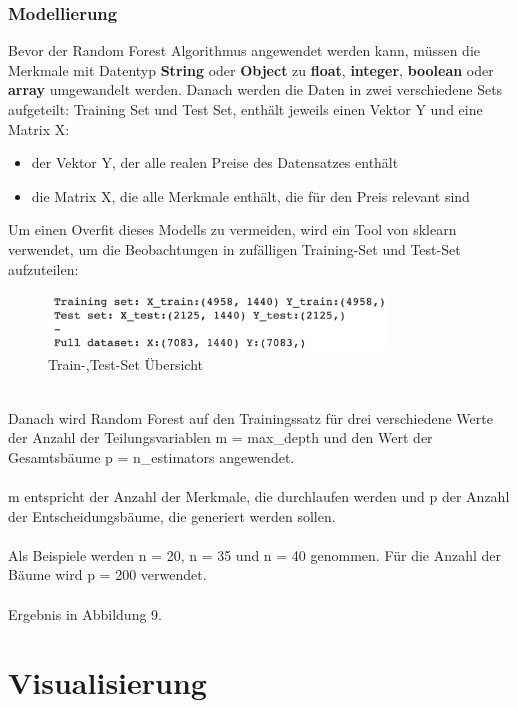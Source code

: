 \documentclass[12pt]{article}
\begin{document}
\begin{text}
\section{Modellierung}
Bevor der Random Forest Algorithmus angewendet werden kann, müssen die Merkmale mit Datentyp \textbf{String} oder \textbf{Object} zu \textbf{float}, \textbf{integer}, \textbf{boolean} oder \textbf{array} umgewandelt werden. Danach werden die Daten in zwei verschiedene Sets aufgeteilt: Training Set und Test Set, enthält jeweils einen Vektor Y und eine Matrix X: 
\begin{itemize}
    \item der Vektor Y, der alle realen Preise des Datensatzes enthält
    \item die Matrix X, die alle Merkmale enthält, die für den Preis relevant sind
\end{itemize}
\newpage
Um einen Overfit dieses Modells zu vermeiden, wird ein Tool von sklearn verwendet, um die Beobachtungen in zufälligen Training-Set und Test-Set aufzuteilen:
\\
\begin{figure}[ht]
\begin{center}
 \includegraphics[width=0.8\textwidth]{split_Set.png}
 \caption{Train-,Test-Set Übersicht}
\end{center}
\end{figure}
\\
Danach wird Random Forest auf den Trainingssatz für drei verschiedene Werte der Anzahl der Teilungsvariablen m = max\_depth und den Wert der Gesamtsbäume p = n\_estimators angewendet. 
\\\\
m entspricht der Anzahl der Merkmale, die durchlaufen werden und p der Anzahl der Entscheidungsbäume, die generiert werden sollen.
\\\\
Als Beispiele werden n = 20, n = 35 und n = 40 genommen. Für die Anzahl der Bäume wird p = 200 verwendet.
\\\\
Ergebnis in Abbildung 9.


\newpage
\part{Visualisierung}

\end{text}
\end{document}
